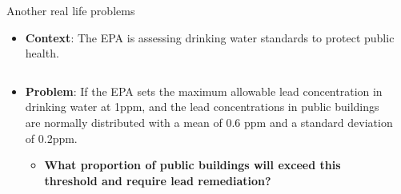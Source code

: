 \documentclass[
  ignorenonframetext,
]{beamer}
\providecommand{\tightlist}{%
  \setlength{\itemsep}{0pt}\setlength{\parskip}{0pt}}
\begin{document}
\begin{frame}{Another real life problems}
\label{another-real-life-problems-1}
\small

\begin{itemize}
\tightlist
\item
  \textbf{Context}: The EPA is assessing drinking water standards to
  protect public health.\\
\end{itemize}

\begin{columns}[T]
\begin{column}{0.5\textwidth}
\small

\begin{itemize}
\tightlist
\item
  \textbf{Problem}: If the EPA sets the maximum allowable lead
  concentration in drinking water at 1ppm, and the lead concentrations
  in public buildings are normally distributed with a mean of 0.6 ppm
  and a standard deviation of 0.2ppm.

  \begin{itemize}
  \tightlist
  \item
    \textbf{What proportion of public buildings will exceed this
    threshold and require lead remediation?}\\
  \end{itemize}
\end{itemize}

\vspace{1cm}
\end{column}

\begin{column}{0.5\textwidth}
\end{column}
\end{columns}
\end{frame}
\end{document}
